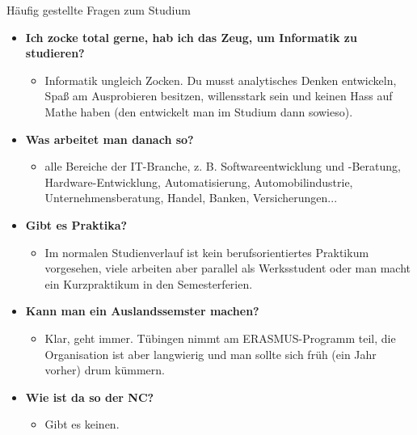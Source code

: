 \begin{block}{Häufig gestellte Fragen zum Studium}
\begin{large}
\begin{itemize}
	

		\item \textbf{Ich zocke total gerne, hab ich das Zeug, um Informatik zu studieren?}
		\begin{itemize}
			\item Informatik ungleich Zocken. Du musst analytisches Denken entwickeln, Spaß am Ausprobieren besitzen, willensstark sein und keinen Hass auf Mathe haben (den entwickelt man im Studium dann sowieso).
		\end{itemize}

	

		\item \textbf{Was arbeitet man danach so?}
		\begin{itemize}
			\item alle Bereiche der IT-Branche, z. B. Softwareentwicklung und -Beratung, Hardware-Entwicklung, Automatisierung, Automobilindustrie, Unternehmensberatung, Handel, Banken, Versicherungen...
		\end{itemize}

	

		\item \textbf{Gibt es Praktika?}
		\begin{itemize}
			\item Im normalen Studienverlauf ist kein berufsorientiertes Praktikum vorgesehen, viele arbeiten aber parallel als Werksstudent oder man macht ein Kurzpraktikum in den Semesterferien.
		\end{itemize}



		\item \textbf{Kann man ein Auslandssemster machen?}
		\begin{itemize}
			\item  Klar, geht immer. Tübingen nimmt am ERASMUS-Programm teil, die Organisation ist aber langwierig und man sollte sich früh (ein Jahr vorher) drum kümmern.
		\end{itemize}



		\item \textbf{Wie ist da so der NC?}
		\begin{itemize}
			\item Gibt es keinen.
		\end{itemize}
\end{itemize}
\end{large}
\end{block}